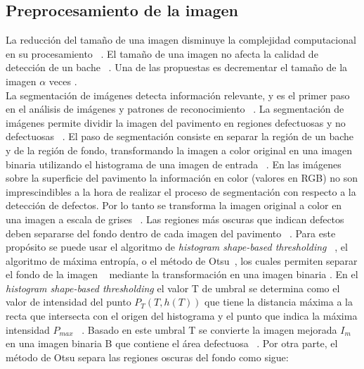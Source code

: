 \subsection{Preprocesamiento de la imagen}
La reducción del tamaño de una imagen  disminuye la complejidad computacional en su procesamiento ~. 
El tamaño de una imagen no afecta la calidad de detección de un bache ~. Una de las propuestas 
es decrementar el tamaño de la imagen $\alpha$ veces . \\
La segmentación de imágenes detecta información relevante, y es el primer paso en el análisis de imágenes y patrones
de reconocimiento ~.
La segmentación de imágenes permite  dividir la imagen del pavimento en regiones defectuosas y no defectuosas ~.
El paso de segmentación consiste en separar la región de un bache y de la región de fondo, transformando la imagen a color original 
en una imagen binaria utilizando el histograma de una imagen de entrada ~.
En las imágenes sobre la superficie del pavimento la información en color (valores en RGB) no son imprescindibles a la hora de realizar 
el proceso de segmentación con respecto a la detección de defectos. Por lo tanto se  transforma la imagen original a color en una 
imagen a escala de grises  ~. Las regiones más oscuras que indican defectos deben separarse del fondo 
dentro de cada imagen del pavimento ~. Para este propósito se puede usar el algoritmo de 
\emph{histogram shape-based thresholding} ~, el algoritmo de máxima entropía, o el método de Otsu~, 
los cuales permiten separar el fondo de la imagen ~ mediante la transformación en una imagen binaria . 
En el \emph{histogram shape-based thresholding} el valor T de umbral se determina como el valor de intensidad del punto $P_T(T, h(T))$ que tiene la distancia máxima a la recta 
que intersecta con el origen del histograma y el punto que indica la máxima intensidad $P_{max}$ ~. 
Basado en este umbral T se convierte la imagen mejorada $I_{m}$ en una imagen binaria B que contiene el área defectuosa ~.
Por otra parte, el método de Otsu separa las regiones oscuras del fondo como sigue:


